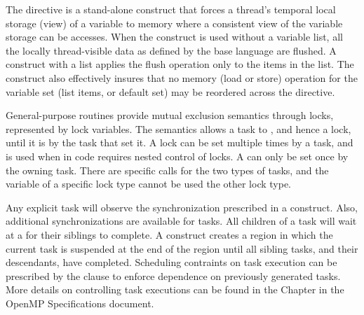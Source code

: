 The  directive is a stand-alone construct that forces a thread's 
temporal local storage (view) of a variable to memory where a consistent view
of the variable storage can be accesses.  When the construct is used without 
a variable list, all the locally thread-visible data as defined by the 
base language are flushed.  A construct with a list applies the flush 
operation only to the items in the list.  The  construct also 
effectively insures that no memory (load or store) operation for
the variable set (list items, or default set) may be reordered across 
the  directive. 

General-purpose routines provide mutual exclusion semantics through locks, 
represented by lock variables.  
The semantics allows a task to , and hence 
 a lock, until it is  by the task that set it. A 
 lock can be set multiple times by a task, and is used
when in code requires nested control of locks.  A  can
only be set once by the owning task. There are specific calls for the two
types of tasks, and the variable of a specific lock type cannot be used the
other lock type.  

Any explicit task will observe the synchronization prescribed in a 
 construct.  Also, additional synchronizations are available for tasks.
All children of a task will wait at a  for their siblings
to complete.  A  construct creates a region in which the
current task is suspended at the end of the region until all sibling tasks, 
and their descendants, have completed. 
Scheduling contraints on task execution can be prescribed by the 
clause to enforce dependence on previously generated tasks.
More details on controlling task executions can be found in the  Chapter
in the OpenMP Specifications document. %
